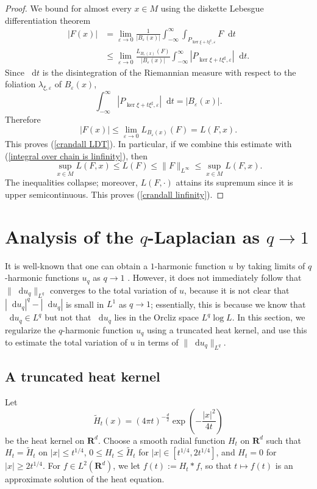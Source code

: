 \documentclass[reqno,11pt]{amsart}
\newcommand{\RR}{\mathbf{R}}
\newcommand*\dif{\mathop{}\!\mathrm{d}}
\theoremstyle{definition}
\numberwithin{equation}{section}
\begin{document}
\begin{proof}
We bound for almost every $x \in M$ using the diskette Lebesgue differentiation theorem
\begin{align*}
|F(x)|
&= \lim_{\varepsilon \to 0} \frac{1}{|B_\varepsilon(x)|} \int_{-\infty}^\infty \int_{P_{\ker \xi + t\xi^\sharp, \varepsilon}} F \dif t \\
&\leq \lim_{\varepsilon \to 0} \frac{L_{B_\varepsilon(x)}(F)}{|B_\varepsilon(x)|} \int_{-\infty}^\infty |P_{\ker \xi + t\xi^\sharp, \varepsilon}| \dif t.
\end{align*}
Since $\dif t$ is the disintegration of the Riemannian measure with respect to the foliation $\lambda_{\xi, \varepsilon}$ of $B_\varepsilon(x)$,
$$\int_{-\infty}^\infty |P_{\ker \xi + t\xi^\sharp, \varepsilon}| \dif t = |B_\varepsilon(x)|.$$
Therefore
$$|F(x)| \leq \lim_{\varepsilon \to 0} L_{B_\varepsilon(x)}(F) = L(F, x).$$
This proves (\ref{crandall LDT}). In particular, if we combine this estimate with (\ref{integral over chain is linfinity}), then
$$\sup_{x \in M} L(F, x) \leq L(F) \leq \|F\|_{L^\infty} \leq \sup_{x \in M} L(F, x).$$
The inequalities collapse; moreover, $L(F, \cdot)$ attains its supremum since it is upper semicontinuous.
This proves (\ref{crandall linfinity}).
\end{proof}

\section{Analysis of the \texorpdfstring{$q$-Laplacian as $q \to 1$}{q-Laplacian}}\label{qLaplace theory}
It is well-known that one can obtain a $1$-harmonic function $u$ by taking limits of $q$-harmonic functions $u_q$ as $q \to 1$ \cite{Mazon14}.
However, it does not immediately follow that $\|\dif u_q\|_{L^q}$ converges to the total variation of $u$, because it is not clear that $|\dif u_q|^q - |\dif u_q|$ is small in $L^1$ as $q \to 1$; essentially, this is because we know that $\dif u_q \in L^q$ but not that $\dif u_q$ lies in the Orcliz space $L^q \log L$.
In this section, we regularize the $q$-harmonic function $u_q$ using a truncated heat kernel, and use this to estimate the total variation of $u$ in terms of $\|\dif u_q\|_{L^q}$.

\subsection{A truncated heat kernel}\label{truncated heat kernel}
Let
$$\tilde H_t(x) = (4\pi t)^{-\frac{d}{2}} \exp\left(-\frac{|x|^2}{4t}\right)$$
be the heat kernel on $\RR^d$.
Choose a smooth radial function $H_t$ on $\RR^d$ such that $H_t = \tilde H_t$ on $|x| \leq t^{1/4}$, $0 \leq H_t \leq \tilde H_t$ for $|x| \in [t^{1/4}, 2t^{1/4}]$, and $H_t = 0$ for $|x| \geq 2 t^{1/4}$.
For $f \in L^2(\RR^d)$, we let $f(t) := H_t * f$, so that $t \mapsto f(t)$ is an approximate solution of the heat equation.
\end{document}
